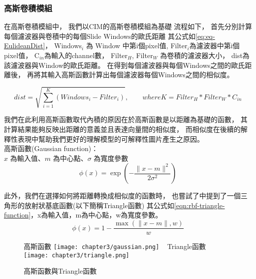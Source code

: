 \documentclass[class=NCU_thesis, crop=false]{standalone}
\begin{document}
		\subsubsection{高斯卷積模組}
			在高斯卷積模組中，
			我們以CIM的高斯卷積模組為基礎
			流程如下，
			首先分別計算每個濾波器與卷積中的每個Slide Windows的歐氏距離
			其公式如\cref{eq:eq-EulideanDist}，
			Windows$_{i}$ 為 Window 中第i個pixel值, 
			Filter$_{i}$為濾波器中第i個pixel值，
			C$_{in}$為輸入的channel數，
			Filter$_{H}$, Filter$_{W}$ 為卷積的濾波器大小，
			dist為該濾波器與Window的歐氏距離。
			在得到每個濾波器與每個Windows之間的歐氏距離後，
			再將其輸入高斯函數計算出每個濾波器每個Windows之間的相似度。

			\begin{equation}
			    \label{eq:eq-EulideanDist}
			    dist = \sqrt{\sum_{i = 1}^{K} (Windows_{i} - Filter_{i})},\qquad where K = Filter_{H} * Filter_{W} * C_{in}
			\end{equation}

				我們在此利用高斯函數取代內積的原因在於高斯函數是以距離為基礎的函數，
			其計算結果能夠反映出距離的意義並且表達向量間的相似度，
			而相似度在後續的解釋性表現中幫助我們更好的理解模型的可解釋性圖片產生之原因。\\
			高斯函數(Gaussian function)：\\
			  $x$ 為輸入值、$m$ 為中心點、$\sigma$ 為寬度參數
			  \begin{equation}
			      \label{eqn:rbf-gaussian-function}
			      \phi (x) = \exp \left( -\frac{\| x-m \|^2}{2\sigma ^2} \right) 
			  \end{equation}

		  	此外，我們在選擇如何將距離轉換成相似度的函數時，
		  	也嘗試了\cite{YangCNNInterpretable}中提到了一個三角形的放射狀基底函數(以下簡稱Triangle函數)
		  	其公式如\cref{eqn:rbf-triangle-function}，x為輸入值，m為中心點，w為寬度參數。
		  	\begin{equation}
		      \label{eqn:rbf-triangle-function}
		      \phi (x) = 1 - \frac{ \max \left( \| x-m \|, w \right)}{w}
		  	\end{equation}

		  	\begin{figure}[H]
		    \centering
		    \subcaptionbox
		        {高斯函數
		        \label{fig:gaussian}}
		        {\texttt{[image: chapter3/gaussian.png]}}
		    ~
		    \subcaptionbox
		        {Triangle函數
		        \label{fig:triangle}}
		        {\texttt{[image: chapter3/triangle.png]}}
		    \caption{高斯函數與Triangle函數\cite{YangCNNInterpretable}}
		    \label{fig:rbf}
			\end{figure}
\end{document}
